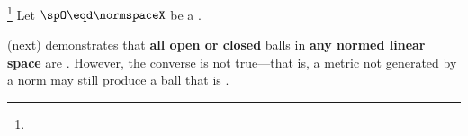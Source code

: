 

\begin{corollary}
\label{cor:norm_continuous}
\footnote{
  }
Let $\spO\eqd\normspaceX$ be a  .
\end{corollary}

 (next) demonstrates that {\bf all open or closed} balls in
{\bf any normed linear space} are .
However, the converse is not true---that is, 
a metric not generated by a norm may still produce a ball that is . %

